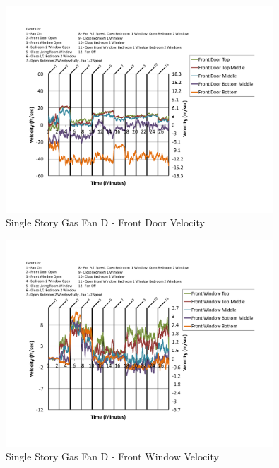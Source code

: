 \documentclass{article}
\begin{document}
\begin{appendices}
	\begin{figure}[H]
		\centering
		\includegraphics[height=3.05in,trim=0.67in 1.1in 0.67in 0.8in,clip=true]{0_Images/Results_Charts/ColdFlow/Single_Story/Gas/D/Front_Door_Velocity.pdf}
		\caption{Single Story Gas Fan D - Front Door Velocity}
	\end{figure}
 

	\begin{figure}[H]
		\centering
		\includegraphics[height=3.05in,trim=0.67in 1.1in 0.67in 0.8in,clip=true]{0_Images/Results_Charts/ColdFlow/Single_Story/Gas/D/Front_Window_Velocity.pdf}
		\caption{Single Story Gas Fan D - Front Window Velocity}
	\end{figure}
 
	\clearpage


\end{appendices}
\end{document}
